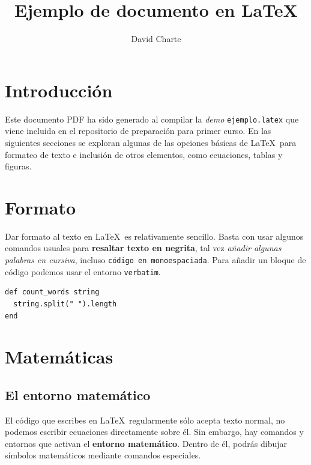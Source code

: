 \documentclass[a4paper]{article}
\title{Ejemplo de documento en LaTeX}
\author{David Charte}
\begin{document}
\maketitle

\section{Introducción}

Este documento PDF ha sido generado al compilar la \textit{demo}
\texttt{ejemplo.latex} que viene incluida en el repositorio de
preparación para primer curso. En las siguientes secciones se exploran
algunas de las opciones básicas de \LaTeX\ para formateo de texto e
inclusión de otros elementos, como ecuaciones, tablas y figuras.

\section{Formato}

Dar formato al texto en \LaTeX\ es relativamente sencillo. Basta con
usar algunos comandos usuales para \textbf{resaltar texto en negrita},
tal vez \textit{añadir algunas palabras en cursiva}, incluso
\texttt{código en monoespaciada}. Para añadir un bloque de código
podemos usar el entorno \texttt{verbatim}.

\begin{verbatim}
def count_words string
  string.split(" ").length
end
\end{verbatim}

\section{Matemáticas}

\subsection{El entorno matemático}
El código que escribes en \LaTeX\ regularmente sólo acepta texto
normal, no podemos escribir ecuaciones directamente sobre él. Sin
embargo, hay comandos y entornos que activan el \textbf{entorno
  matemático}. Dentro de él, podrás dibujar símbolos matemáticos
mediante comandos especiales.
\end{document}
